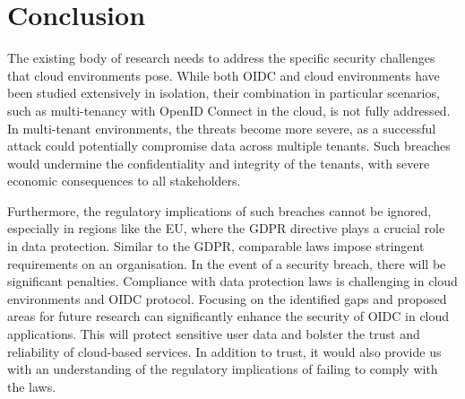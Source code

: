 \section{Conclusion}
The existing body of research needs to address the specific security challenges that cloud environments pose.
While both OIDC and cloud environments have been studied extensively in isolation, their combination in particular scenarios, such as multi-tenancy with OpenID Connect in the cloud, is not fully addressed.
In multi-tenant environments, the threats become more severe, as a successful attack could potentially compromise data across multiple tenants.
Such breaches would undermine the confidentiality and integrity of the tenants, with severe economic consequences to all stakeholders.\par

Furthermore, the regulatory implications of such breaches cannot be ignored, especially in regions like the EU, where the GDPR directive plays a crucial role in data protection.
Similar to the GDPR, comparable laws impose stringent requirements on an organisation.
In the event of a security breach, there will be significant penalties.
Compliance with data protection laws is challenging in cloud environments and OIDC protocol.
Focusing on the identified gaps and proposed areas for future research can significantly enhance the security of OIDC in cloud applications.
This will protect sensitive user data and bolster the trust and reliability of cloud-based services.
In addition to trust, it would also provide us with an understanding of the regulatory implications of failing to comply with the laws.




 



